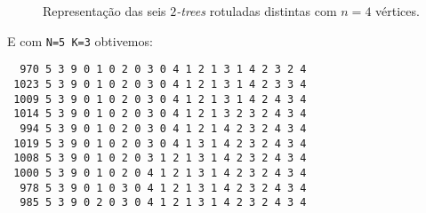 \begin{figure}
\begin{minipage}{0.1666\textwidth}
{
    }
  \end{minipage}\begin{minipage}{0.1666\textwidth}
    \centering
  \end{minipage}

  \caption{Representação das seis \emph{$2$-trees} rotuladas distintas com $n = 4$ vértices.}
  \label{fig:n4k2}
\end{figure}

E com {\tt N=5 K=3} obtivemos:

\begin{lstlisting}
  970 5 3 9 0 1 0 2 0 3 0 4 1 2 1 3 1 4 2 3 2 4
 1023 5 3 9 0 1 0 2 0 3 0 4 1 2 1 3 1 4 2 3 3 4
 1009 5 3 9 0 1 0 2 0 3 0 4 1 2 1 3 1 4 2 4 3 4
 1014 5 3 9 0 1 0 2 0 3 0 4 1 2 1 3 2 3 2 4 3 4
  994 5 3 9 0 1 0 2 0 3 0 4 1 2 1 4 2 3 2 4 3 4
 1019 5 3 9 0 1 0 2 0 3 0 4 1 3 1 4 2 3 2 4 3 4
 1008 5 3 9 0 1 0 2 0 3 1 2 1 3 1 4 2 3 2 4 3 4
 1000 5 3 9 0 1 0 2 0 4 1 2 1 3 1 4 2 3 2 4 3 4
  978 5 3 9 0 1 0 3 0 4 1 2 1 3 1 4 2 3 2 4 3 4
  985 5 3 9 0 2 0 3 0 4 1 2 1 3 1 4 2 3 2 4 3 4
\end{lstlisting}


%
%
%

